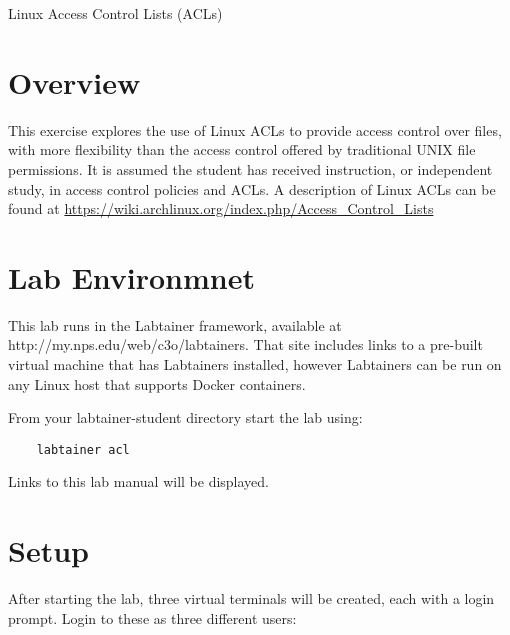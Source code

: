 


\begin{center}
{\LARGE Linux Access Control Lists (ACLs)}
\vspace{0.1in}\\
\end{center}

\copyrightnotice

\section{Overview}
This exercise explores the use of Linux ACLs to provide
access control over files, with more flexibility than 
the access control offered by traditional UNIX file permissions.
It is assumed the student has received instruction, or independent
study, in access control policies and ACLs.  A description of
Linux ACLs can be found at 
\url {https://wiki.archlinux.org/index.php/Access\_Control\_Lists}

\section{Lab Environmnet}
This lab runs in the Labtainer framework,
available at http://my.nps.edu/web/c3o/labtainers.
That site includes links to a pre-built virtual machine
that has Labtainers installed, however Labtainers can
be run on any Linux host that supports Docker containers.

From your labtainer-student directory start the lab using:
\begin{verbatim}
    labtainer acl
\end{verbatim}
Links to this lab manual will be displayed.  

\section{Setup}
After starting the lab, three virtual terminals will be created, each with a login
prompt.  Login to these as three different users:

